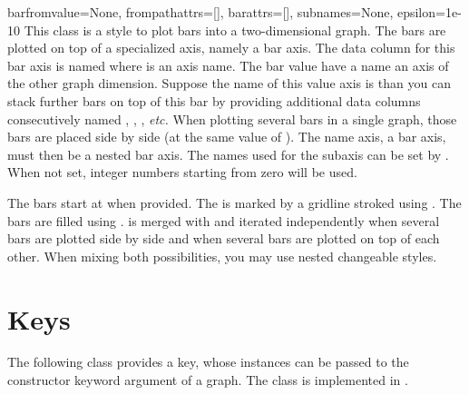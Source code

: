 \begin{classdesc}{bar}{fromvalue=None, frompathattrs=[], barattrs=[],
                       subnames=None, epsilon=1e-10}
  This class is a style to plot bars into a two-dimensional graph. The
  bars are plotted on top of a specialized axis, namely a bar axis.
  The data column for this bar axis is named  where
   is an axis name. The bar value have a name an axis of the
  other graph dimension. Suppose the name of this value axis is
   than you can stack further bars on top of this bar by
  providing additional data columns consecutively named
  , , , \emph{etc.}
  When plotting several bars in a single graph, those bars are placed
  side by side (at the same value of ). The name axis, a
  bar axis, must then be a nested bar axis. The names used for the
  subaxis can be set by . When not set, integer numbers
  starting from zero will be used.

  The bars start at  when provided. The 
  is marked by a gridline stroked using . The bars
  are filled using .  is merged with
   and
  iterated independently when several bars are plotted side by side
  and when several bars are plotted on top of each other. When mixing
  both possibilities, you may use nested changeable styles.
\end{classdesc}

\section{Keys\label{graph:key}}


The following class provides a key, whose instances can be passed to
the constructor keyword argument  of a graph. The class is
implemented in .

